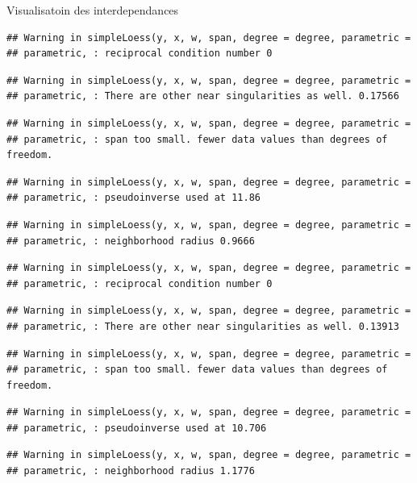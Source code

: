 \documentclass[11pt,ignorenonframetext,]{beamer}
\begin{document}
\begin{frame}[fragile]{Visualisatoin des interdependances}
\begin{verbatim}
## Warning in simpleLoess(y, x, w, span, degree = degree, parametric =
## parametric, : reciprocal condition number 0
\end{verbatim}

\begin{verbatim}
## Warning in simpleLoess(y, x, w, span, degree = degree, parametric =
## parametric, : There are other near singularities as well. 0.17566
\end{verbatim}

\begin{verbatim}
## Warning in simpleLoess(y, x, w, span, degree = degree, parametric =
## parametric, : span too small. fewer data values than degrees of freedom.
\end{verbatim}

\begin{verbatim}
## Warning in simpleLoess(y, x, w, span, degree = degree, parametric =
## parametric, : pseudoinverse used at 11.86
\end{verbatim}

\begin{verbatim}
## Warning in simpleLoess(y, x, w, span, degree = degree, parametric =
## parametric, : neighborhood radius 0.9666
\end{verbatim}

\begin{verbatim}
## Warning in simpleLoess(y, x, w, span, degree = degree, parametric =
## parametric, : reciprocal condition number 0
\end{verbatim}

\begin{verbatim}
## Warning in simpleLoess(y, x, w, span, degree = degree, parametric =
## parametric, : There are other near singularities as well. 0.13913
\end{verbatim}

\begin{verbatim}
## Warning in simpleLoess(y, x, w, span, degree = degree, parametric =
## parametric, : span too small. fewer data values than degrees of freedom.
\end{verbatim}

\begin{verbatim}
## Warning in simpleLoess(y, x, w, span, degree = degree, parametric =
## parametric, : pseudoinverse used at 10.706
\end{verbatim}

\begin{verbatim}
## Warning in simpleLoess(y, x, w, span, degree = degree, parametric =
## parametric, : neighborhood radius 1.1776
\end{verbatim}


\end{frame}
\end{document}
